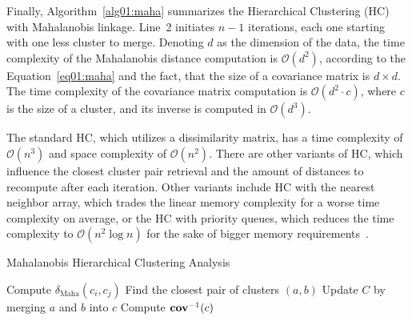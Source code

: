 Finally, Algorithm~\ref{alg01:maha} summarizes the Hierarchical Clustering (HC) with Mahalanobis linkage. Line~2 initiates $n-1$ iterations, each one starting with one less cluster to merge. Denoting $d$ as the dimension of the data, the time complexity of the Mahalanobis distance computation is $\mathcal{O}(d^2)$, according to the Equation~\ref{eq01:maha} and the fact, that the size of a covariance matrix is $d \times d$. The time complexity of the covariance matrix computation is $\mathcal{O}(d^2 \cdot c)$, where $c$ is the size of a cluster, and its inverse is computed in $\mathcal{O}(d^3)$. 

The standard HC, which utilizes a dissimilarity matrix, has a time complexity of $\mathcal{O}(n^3)$ and space complexity of $\mathcal{O}(n^2)$. There are other variants of HC, which influence the closest cluster pair retrieval and the amount of distances to recompute after each iteration. Other variants include HC with the nearest neighbor array, which trades the linear memory complexity for a worse time complexity on average, or the HC with priority queues, which reduces the time complexity to $\mathcal{O}(n^2 \log n)$ for the sake of bigger memory requirements~\cite{day1984efficient}. 

\begin{algorithm}[t]
    \caption{Mahalanobis Hierarchical Clustering Analysis}
    \label{alg01:maha}
    \begin{algorithmic}[1]
                \State Compute $\delta_\text{Maha}(c_i,c_j)$ 
            \EndFor
            \State Find the closest pair of clusters $(a, b)$
            \State Update $C$ by merging $a$ and $b$ into $c$
            \State Compute $\operatorname{\textbf{cov}}^{-1}(c)$ 
        \EndWhile
        \EndProcedure
    \end{algorithmic}
\end{algorithm}




